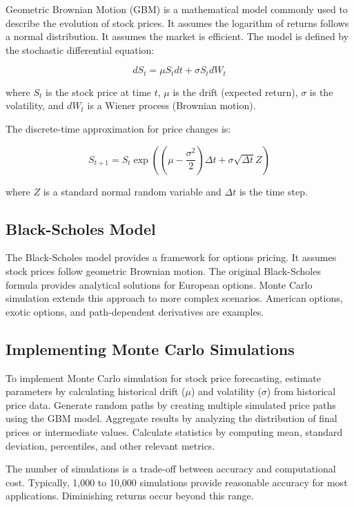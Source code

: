 Geometric Brownian Motion (GBM) is a mathematical model commonly used to describe the evolution of stock prices. It assumes the logarithm of returns follows a normal distribution. It assumes the market is efficient. The model is defined by the stochastic differential equation:

\[
dS_t = \mu S_t dt + \sigma S_t dW_t
\]

where \(S_t\) is the stock price at time \(t\), \(\mu\) is the drift (expected return), \(\sigma\) is the volatility, and \(dW_t\) is a Wiener process (Brownian motion).

The discrete-time approximation for price changes is:

\[
S_{t+1} = S_t \exp\left((\mu - \frac{\sigma^2}{2})\Delta t + \sigma \sqrt{\Delta t} Z\right)
\]

where \(Z\) is a standard normal random variable and \(\Delta t\) is the time step.

\subsection{Black-Scholes Model}

The Black-Scholes model provides a framework for options pricing. It assumes stock prices follow geometric Brownian motion. The original Black-Scholes formula provides analytical solutions for European options. Monte Carlo simulation extends this approach to more complex scenarios. American options, exotic options, and path-dependent derivatives are examples.

\subsection{Implementing Monte Carlo Simulations}

To implement Monte Carlo simulation for stock price forecasting, estimate parameters by calculating historical drift (\(\mu\)) and volatility (\(\sigma\)) from historical price data. Generate random paths by creating multiple simulated price paths using the GBM model. Aggregate results by analyzing the distribution of final prices or intermediate values. Calculate statistics by computing mean, standard deviation, percentiles, and other relevant metrics.

The number of simulations is a trade-off between accuracy and computational cost. Typically, 1,000 to 10,000 simulations provide reasonable accuracy for most applications. Diminishing returns occur beyond this range.

